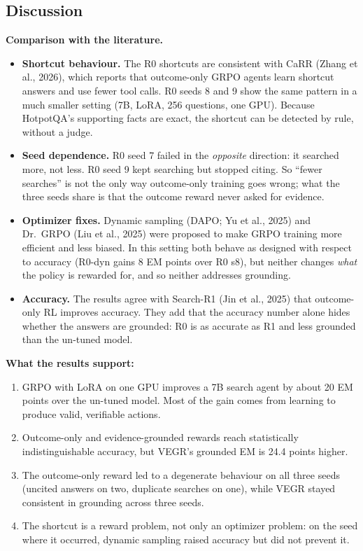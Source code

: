 \subsection{Discussion}\label{sec:4.8}

\textbf{Comparison with the literature.}

\begin{itemize}
\tightlist
\item
  \textbf{Shortcut behaviour.} The R0 shortcuts are consistent with CaRR
  (Zhang et al., 2026), which reports that outcome-only GRPO agents
  learn shortcut answers and use fewer tool calls. R0 seeds 8 and 9 show
  the same pattern in a much smaller setting (7B, LoRA, 256 questions,
  one GPU). Because HotpotQA's supporting facts are exact, the shortcut
  can be detected by rule, without a judge.
\item
  \textbf{Seed dependence.} R0 seed 7 failed in the \emph{opposite}
  direction: it searched more, not less. R0 seed 9 kept searching but
  stopped citing. So ``fewer searches'' is not the only way outcome-only
  training goes wrong; what the three seeds share is that the outcome
  reward never asked for evidence.
\item
  \textbf{Optimizer fixes.} Dynamic sampling (DAPO; Yu et al., 2025) and
  Dr.~GRPO (Liu et al., 2025) were proposed to make GRPO training more
  efficient and less biased. In this setting both behave as designed
  with respect to accuracy (R0-dyn gains 8 EM points over R0 s8), but
  neither changes \emph{what} the policy is rewarded for, and so neither
  addresses grounding.
\item
  \textbf{Accuracy.} The results agree with Search-R1 (Jin et al., 2025)
  that outcome-only RL improves accuracy. They add that the accuracy
  number alone hides whether the answers are grounded: R0 is as accurate
  as R1 and less grounded than the un-tuned model.
\end{itemize}

\textbf{What the results support:}

\begin{enumerate}
\def\labelenumi{\arabic{enumi}.}
\tightlist
\item
  GRPO with LoRA on one GPU improves a 7B search agent by about 20 EM
  points over the un-tuned model. Most of the gain comes from learning
  to produce valid, verifiable actions.
\item
  Outcome-only and evidence-grounded rewards reach statistically
  indistinguishable accuracy, but VEGR's grounded EM is 24.4 points
  higher.
\item
  The outcome-only reward led to a degenerate behaviour on all three
  seeds (uncited answers on two, duplicate searches on one), while VEGR
  stayed consistent in grounding across three seeds.
\item
  The shortcut is a reward problem, not only an optimizer problem: on
  the seed where it occurred, dynamic sampling raised accuracy but did
  not prevent it.
\end{enumerate}

